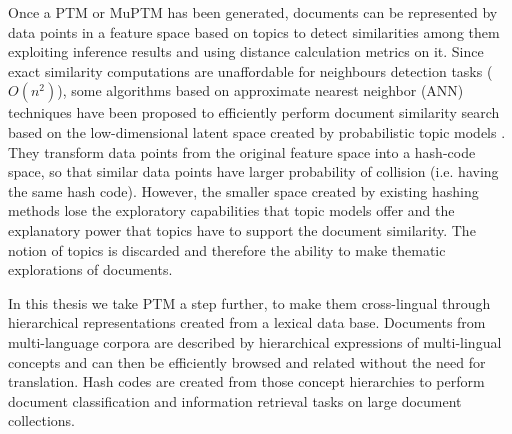 Once a PTM or MuPTM has been generated, documents can be represented by data points in a feature space based on topics to detect similarities among them exploiting inference results and using distance calculation metrics on it. Since exact similarity computations are unaffordable for neighbours detection tasks ($O(n^2)$), some algorithms based on approximate nearest neighbor (ANN) techniques have been proposed to efficiently perform document similarity search based on the low-dimensional latent space created by probabilistic topic models\cite{Zhen2016} \cite{Mao2017}. They transform data points from the original feature space into a hash-code space, so that similar data points have larger probability of collision (i.e. having the same hash code). However, the smaller space created by existing hashing methods lose the exploratory capabilities that topic models offer and the explanatory power that topics have to support the document similarity. The notion of topics is discarded and therefore the ability to make thematic explorations of documents. 


In this thesis we take PTM a step further, to make them cross-lingual through hierarchical representations created from a lexical data base. Documents from multi-language corpora are described by hierarchical expressions of multi-lingual concepts and can then be efficiently browsed and related without the need for translation. Hash codes are created from those concept hierarchies to perform document classification and information retrieval tasks on large document collections.
